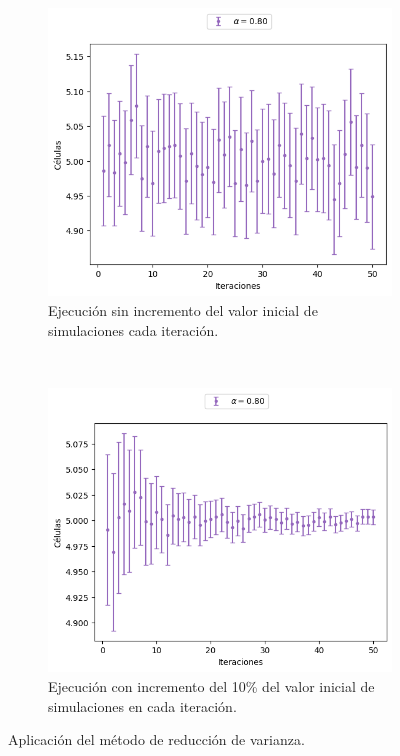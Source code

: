 \documentclass[../proyecto.tex]{memoir}
\begin{document}
\begin{figure}[H]
	\centering
	\begin{subfigure}[b]{0.9\textwidth} 
		\centering
    	\includegraphics[width=\textwidth]{./images/iteracion_without_inc.png}
    	\caption{Ejecución sin incremento del valor inicial de simulaciones cada iteración.}
    	\label{fig:3-1}
    \end{subfigure}
    \\
	\begin{subfigure}[b]{0.9\textwidth} 
        \centering
        \includegraphics[width=\textwidth]{./images/iteracion_inc.png}
        \caption{Ejecución con incremento del 10\% del valor inicial de simulaciones en cada iteración.}
        \label{fig:3-2}
    \end{subfigure}
    \caption{Aplicación del método de reducción de varianza.}
    \label{fig:33}
\end{figure} 
\end{document}
